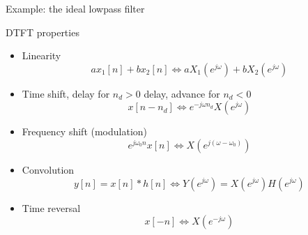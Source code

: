 \documentclass{beamer}
\begin{document}
%
\begin{frame}{Example: the ideal lowpass filter}

\begin{figure}
	\centering
	\resizebox{0.5\linewidth}{!}{}
	\label{fig:ideal-lpf}
\end{figure}


\end{frame}

%
\begin{frame}{DTFT properties}
\begin{itemize}
\item Linearity
\begin{equation*}
ax_1[n]  + bx_2[n] \Longleftrightarrow aX_1(e^{j\omega})+bX_2(e^{j\omega})
\end{equation*}
\item Time shift, delay for $n_d > 0$ delay, advance for $n_d < 0$
\begin{equation*}
x[n-n_d] \Longleftrightarrow e^{-j\omega n_d}X(e^{j\omega})
\end{equation*}
\item Frequency shift (modulation)
\begin{equation*}
e^{j\omega_0n}x[n] \Longleftrightarrow X(e^{j(\omega-\omega_0)})
\end{equation*}
\item Convolution
\begin{equation*}
y[n] = x[n]\ast h[n] \Longleftrightarrow Y(e^{j\omega}) = X(e^{j\omega})H(e^{j\omega})
\end{equation*}
\item Time reversal
\begin{equation*}
x[-n] \Longleftrightarrow X(e^{-j\omega})
\end{equation*}

\end{itemize}
\end{frame}
\end{document}
